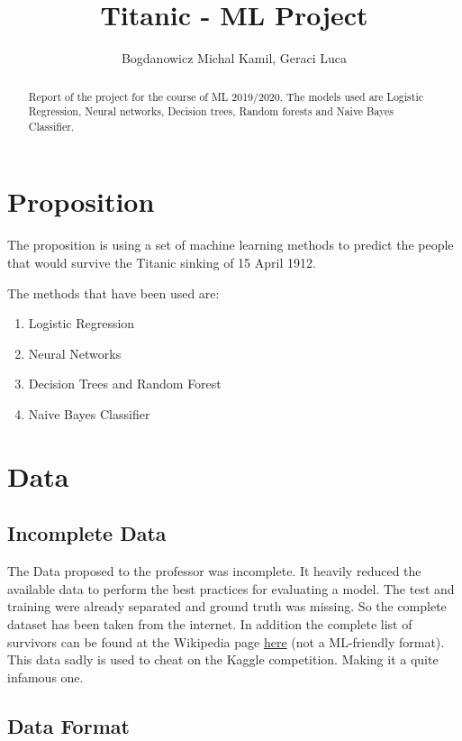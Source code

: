 \documentclass{article}
\begin{document}
\title{Titanic - ML Project}
\author{Bogdanowicz Michal Kamil, Geraci Luca}

\maketitle

\begin{abstract}
Report of the project for the course of ML 2019/2020.
\break The models used are Logistic Regression, Neural networks, Decision trees, Random forests and Naive Bayes Classifier.
\end{abstract}


\section{Proposition}
The proposition is using a set of machine learning methods to predict the people that would survive the Titanic sinking of 15 April 1912.

The methods that have been used are:

\begin{enumerate}  
\item Logistic Regression
\item Neural Networks
\item Decision Trees and Random Forest
\item Naive Bayes Classifier
\end{enumerate}

\section{Data}
\subsection{Incomplete Data}

The Data proposed to the professor was incomplete. It heavily reduced the available data to perform the best practices for evaluating a model. The test and training were already separated and ground truth was missing. So the complete dataset has been taken from the internet. In addition the complete list of survivors can be found at the Wikipedia page \href{https://en.wikipedia.org/wiki/Passengers_of_the_RMS_Titanic}{here} (not a ML-friendly format).
This data sadly is used to cheat on the Kaggle competition. Making it a quite infamous one.

\subsection{Data Format}
\end{document}
